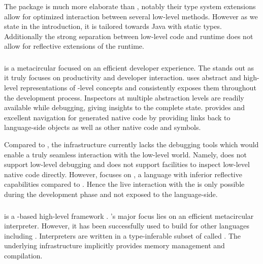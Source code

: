 The  package is much more elaborate than \NB, notably their type system extensions allow for optimized interaction between several low-level methods.
However as we state in the introduction, it is tailored towards Java with static types.
Additionally the strong separation between low-level code and runtime does not allow for reflective extensions of the runtime.

\subsubsection*{\Maxine \Java \VM}
\Maxine is a metacircular \Java \VM \cite{Wimm13a} focused on an efficient developer experience.
The \Maxine \VM stands out as it truly focuses on productivity and developer interaction.
\Maxine uses abstract and high-level representations of \VM-level concepts and consistently exposes them throughout the development process.
Inspectors at multiple abstraction levels are readily available while debugging, giving insights to the complete \VM state.
\Maxine provides and excellent navigation for generated native code by providing links back to language-side objects as well as other native code and symbols.

Compared to \Maxine, the \B infrastructure currently lacks the debugging tools which would enable a truly seamless interaction with the low-level world.
Namely, \B does not support low-level debugging and does not support facilities to inspect low-level native code directly.
However, \Maxine focuses on \Java, a language with inferior reflective capabilities compared to \PH.
Hence the live interaction with the \VM is only possible during the development phase and not exposed to the language-side.


\subsubsection*{\PyPy}
 is a \Python-based high-level \VM framework \cite{Rigo06a}.
\PyPy's major focus lies on an efficient metacircular \Python interpreter.
However, it has been successfully used to build \VMs for other languages including \ST \cite{Bolz08a}.
Interpreters are written in a type-inferable subset of \Python called \RPython.
The underlying \PyPy infrastructure implicitly provides memory management and \JIT compilation.

